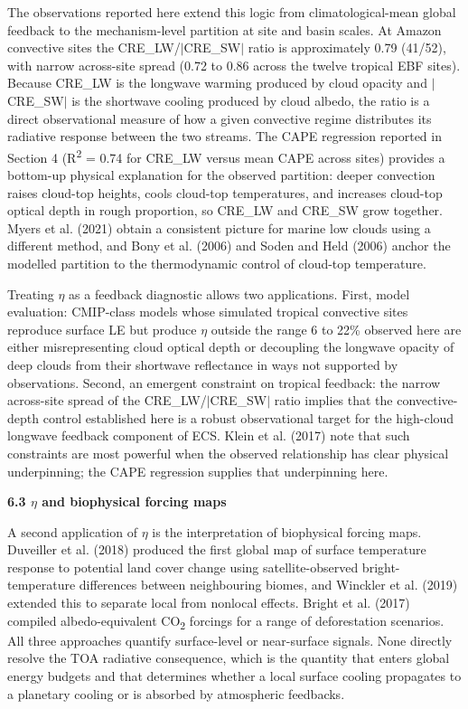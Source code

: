 The observations reported here extend this logic from climatological-mean global feedback to the mechanism-level partition at site and basin scales. At Amazon convective sites the CRE\_LW/\(|\)CRE\_SW\(|\) ratio is approximately 0.79 (41/52), with narrow across-site spread (0.72 to 0.86 across the twelve tropical EBF sites). Because CRE\_LW is the longwave warming produced by cloud opacity and \(|\)CRE\_SW\(|\) is the shortwave cooling produced by cloud albedo, the ratio is a direct observational measure of how a given convective regime distributes its radiative response between the two streams. The CAPE regression reported in Section 4 (R\textsuperscript{2} = 0.74 for CRE\_LW versus mean CAPE across sites) provides a bottom-up physical explanation for the observed partition: deeper convection raises cloud-top heights, cools cloud-top temperatures, and increases cloud-top optical depth in rough proportion, so CRE\_LW and CRE\_SW grow together. Myers et al. (2021) obtain a consistent picture for marine low clouds using a different method, and Bony et al. (2006) and Soden and Held (2006) anchor the modelled partition to the thermodynamic control of cloud-top temperature.

Treating \(\eta\) as a feedback diagnostic allows two applications. First, model evaluation: CMIP-class models whose simulated tropical convective sites reproduce surface LE but produce \(\eta\) outside the range 6 to 22\% observed here are either misrepresenting cloud optical depth or decoupling the longwave opacity of deep clouds from their shortwave reflectance in ways not supported by observations. Second, an emergent constraint on tropical feedback: the narrow across-site spread of the CRE\_LW/\(|\)CRE\_SW\(|\) ratio implies that the convective-depth control established here is a robust observational target for the high-cloud longwave feedback component of ECS. Klein et al. (2017) note that such constraints are most powerful when the observed relationship has clear physical underpinning; the CAPE regression supplies that underpinning here.

\textbf{6.3 \(\eta\) and biophysical forcing maps}

A second application of \(\eta\) is the interpretation of biophysical forcing maps. Duveiller et al. (2018) produced the first global map of surface temperature response to potential land cover change using satellite-observed bright-temperature differences between neighbouring biomes, and Winckler et al. (2019) extended this to separate local from nonlocal effects. Bright et al. (2017) compiled albedo-equivalent CO\textsubscript{2} forcings for a range of deforestation scenarios. All three approaches quantify surface-level or near-surface signals. None directly resolve the TOA radiative consequence, which is the quantity that enters global energy budgets and that determines whether a local surface cooling propagates to a planetary cooling or is absorbed by atmospheric feedbacks.

